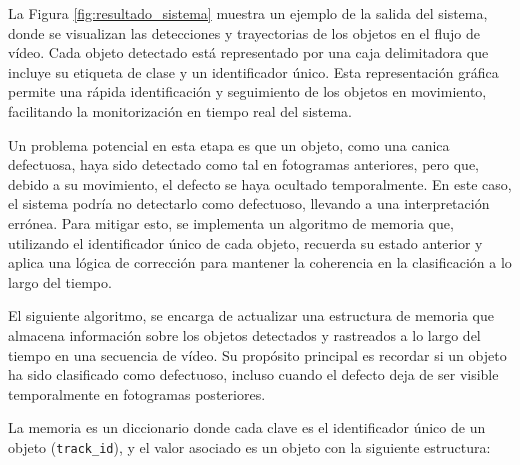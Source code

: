 \documentclass[11pt,spanish,listoffigures,listoftables]{tfgetsinf}
\begin{document}
La Figura \ref{fig:resultado_sistema} muestra un ejemplo de la salida del sistema, donde se visualizan las detecciones y trayectorias de los objetos en el flujo de vídeo. Cada objeto detectado está representado por una caja delimitadora que incluye su etiqueta de clase y un identificador único. Esta representación gráfica permite una rápida identificación y seguimiento de los objetos en movimiento, facilitando la monitorización en tiempo real del sistema.

Un problema potencial en esta etapa es que un objeto, como una canica defectuosa, haya sido detectado como tal en fotogramas anteriores, pero que, debido a su movimiento, el defecto se haya ocultado temporalmente. En este caso, el sistema podría no detectarlo como defectuoso, llevando a una interpretación errónea. Para mitigar esto, se implementa un algoritmo de memoria que, utilizando el identificador único de cada objeto, recuerda su estado anterior y aplica una lógica de corrección para mantener la coherencia en la clasificación a lo largo del tiempo.

El siguiente algoritmo, se encarga de actualizar una estructura de memoria que almacena información sobre los objetos detectados y rastreados a lo largo del tiempo en una secuencia de vídeo. Su propósito principal es recordar si un objeto ha sido clasificado como defectuoso, incluso cuando el defecto deja de ser visible temporalmente en fotogramas posteriores.


La memoria es un diccionario donde cada clave es el identificador único de un objeto (\texttt{track\_id}), y el valor asociado es un objeto con la siguiente estructura:




\end{document}
